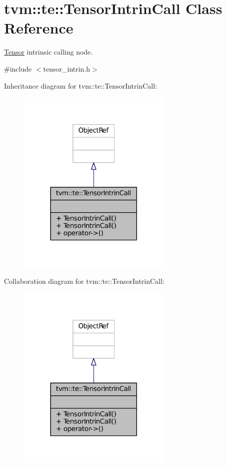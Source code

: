 \hypertarget{classtvm_1_1te_1_1TensorIntrinCall}{}\section{tvm\+:\+:te\+:\+:Tensor\+Intrin\+Call Class Reference}
\label{classtvm_1_1te_1_1TensorIntrinCall}


\hyperlink{classtvm_1_1te_1_1Tensor}{Tensor} intrinsic calling node.  




{\ttfamily \#include $<$tensor\+\_\+intrin.\+h$>$}



Inheritance diagram for tvm\+:\+:te\+:\+:Tensor\+Intrin\+Call\+:
\nopagebreak
\begin{figure}[H]
\begin{center}
\leavevmode
\includegraphics[width=209pt]{classtvm_1_1te_1_1TensorIntrinCall__inherit__graph}
\end{center}
\end{figure}


Collaboration diagram for tvm\+:\+:te\+:\+:Tensor\+Intrin\+Call\+:
\nopagebreak
\begin{figure}[H]
\begin{center}
\leavevmode
\includegraphics[width=209pt]{classtvm_1_1te_1_1TensorIntrinCall__coll__graph}
\end{center}
\end{figure}
